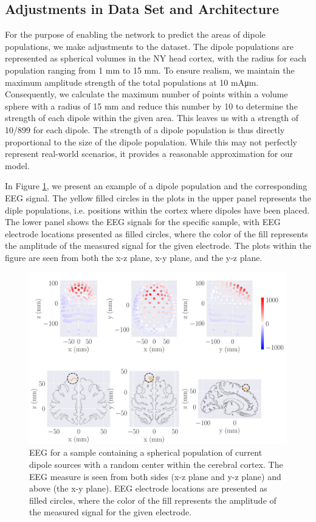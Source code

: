 \documentclass[a4paper, UKenglish, 11pt]{uiomaster}
\begin{document}
\subsection{Adjustments in Data Set and Architecture}

For the purpose of enabling the network to predict the areas of dipole populations, we make adjustments to the dataset. The dipole populations are represented as spherical volumes in the NY head cortex, with the radius for each population ranging from 1 mm to 15 mm. To ensure realism, we maintain the maximum amplitude strength of the total populations at 10 mAμm. Consequently, we calculate the maximum number of points within a volume sphere with a radius of 15 mm and reduce this number by 10 to determine the strength of each dipole within the given area. This leaves us with a strength of 10/899 for each dipole. The strength of a dipole population is thus directly proportional to the size of the dipole population. While this may not perfectly represent real-world scenarios, it provides a reasonable approximation for our model.

In Figure \ref{fig:dipole_area}, we present an example of a dipole population and the corresponding EEG signal. The yellow filled circles in the plots in the upper panel represents the diple populations, i.e. positions within the cortex where dipoles have been placed. The lower panel shows the EEG signals for the specific sample, with EEG electrode locations presented as filled circles, where the color of the fill represents the amplitude of the measured signal for the given electrode. The plots within the figure are seen from both the x-z plane, x-y plane, and the y-z plane.

\begin{figure}[!htb]
\centering
\includegraphics[width=\linewidth]{figures/dipole_area_reduced_0.pdf}
\caption{EEG for a sample containing a spherical population of current dipole sources with a random center within the cerebral cortex. The EEG measure is seen from both sides (x-z plane and y-z plane) and above (the x-y plane). EEG electrode locations are presented as filled circles, where the color of the fill represents the amplitude of the measured signal for the given electrode.}
\label{fig:dipole_area}
\end{figure}
\end{document}
